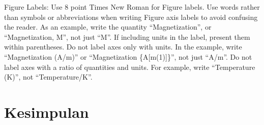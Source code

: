 \documentclass[conference]{IEEEtran}
\begin{document}
Figure Labels: Use 8 point Times New Roman for Figure labels. Use words 
rather than symbols or abbreviations when writing Figure axis labels to 
avoid confusing the reader. As an example, write the quantity 
``Magnetization'', or ``Magnetization, M'', not just ``M''. If including 
units in the label, present them within parentheses. Do not label axes only 
with units. In the example, write ``Magnetization (A/m)'' or ``Magnetization 
\{A[m(1)]\}'', not just ``A/m''. Do not label axes with a ratio of 
quantities and units. For example, write ``Temperature (K)'', not 
``Temperature/K''.

\section{Kesimpulan}
\section*{}


\end{document}
